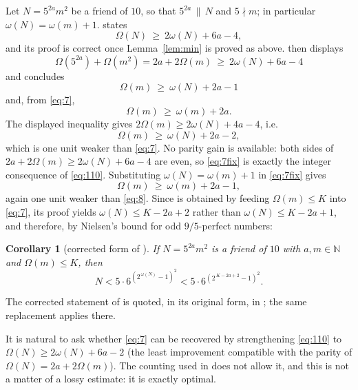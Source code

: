 \documentclass[11pt,a4paper]{article}
\theoremstyle{plain}
\newtheorem{corollary}[theorem]{Corollary}
\theoremstyle{definition}
\newcommand{\NN}{\mathbb{N}}
\begin{document}
Let $N=5^{2a}m^{2}$ be a friend of $10$, so that $5^{2a}\,\|\,N$ and $5\nmid m$; in
particular $\omega(N)=\omega(m)+1$. \cite[Theorem 1.10]{CMM10} states
\begin{equation}\label{eq:110}
  \Omega(N)\ \ge\ 2\omega(N)+6a-4 ,
\end{equation}
and its proof is correct once Lemma~\ref{lem:min} is proved as above.
\cite[Remark 3.7]{CMM10} then displays
\[
  \Omega(5^{2a})+\Omega(m^{2})=2a+2\Omega(m)\ \ge\ 2\omega(N)+6a-4
\]
and concludes
\begin{equation}\label{eq:7}
  \Omega(m)\ \ge\ \omega(N)+2a-1 \tag{7}
\end{equation}
and, from \eqref{eq:7},
\begin{equation}\label{eq:8}
  \Omega(m)\ \ge\ \omega(m)+2a. \tag{8}
\end{equation}
The displayed inequality gives $2\Omega(m)\ge 2\omega(N)+4a-4$, i.e.
\begin{equation}\label{eq:7fix}
  \Omega(m)\ \ge\ \omega(N)+2a-2 ,\tag{7$'$}
\end{equation}
which is one unit weaker than \eqref{eq:7}. No parity gain is available: both sides
of $2a+2\Omega(m)\ge 2\omega(N)+6a-4$ are even, so \eqref{eq:7fix} is exactly the
integer consequence of \eqref{eq:110}. Substituting $\omega(N)=\omega(m)+1$ in
\eqref{eq:7fix} gives
\begin{equation}\label{eq:8fix}
  \Omega(m)\ \ge\ \omega(m)+2a-1 ,\tag{8$'$}
\end{equation}
again one unit weaker than \eqref{eq:8}. Since \cite[Corollary 1.11]{CMM10} is
obtained by feeding $\Omega(m)\le K$ into \eqref{eq:7}, its proof yields
$\omega(N)\le K-2a+2$ rather than $\omega(N)\le K-2a+1$, and therefore, by
Nielsen's bound \cite[Lemma 2.5]{CMM10} for odd $9/5$-perfect numbers:

\begin{corollary}[corrected form of {\cite[Corollary 1.11]{CMM10}}]\label{cor:111}
If $N=5^{2a}m^{2}$ is a friend of $10$ with $a,m\in\NN$ and $\Omega(m)\le K$, then
\[
  N<5\cdot 6^{\left(2^{\,\omega(N)}-1\right)^{2}}
   <5\cdot 6^{\left(2^{\,K-2a+2}-1\right)^{2}} .
\]
\end{corollary}

The corrected statement of \cite[Corollary 1.11]{CMM10} is quoted, in its original
form, in \cite[\S1]{M20div}; the same replacement applies there.

It is natural to ask whether \eqref{eq:7} can be recovered by strengthening
\eqref{eq:110} to $\Omega(N)\ge 2\omega(N)+6a-2$ (the least improvement compatible
with the parity of $\Omega(N)=2a+2\Omega(m)$). The counting used in \cite{CMM10} does
not allow it, and this is not a matter of a lossy estimate: it is exactly optimal.
\end{document}
